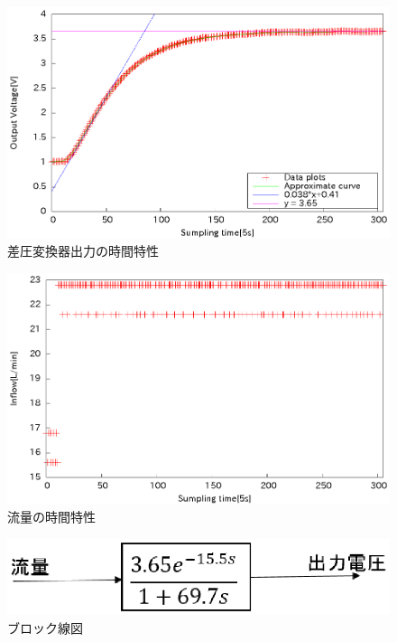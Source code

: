\documentclass[11pt,a4paper]{jsarticle}
\begin{document}
   \begin{figure}
    \begin{center}
     \includegraphics[scale=.7] {./picture/exp3_2.eps}
     \caption{差圧変換器出力の時間特性}
     \label{fig5}
    \end{center}
   \end{figure}

   \begin{figure}
    \begin{center}
     \includegraphics[scale=.7] {./picture/exp3.eps}
     \caption{流量の時間特性}
     \label{fig6}
    \end{center}
   \end{figure}

   \begin{figure}
    \begin{center}
     \includegraphics[scale=.7] {./picture/blocks_exp3.eps}
     \caption{ブロック線図}
     \label{fig7}
    \end{center}
   \end{figure}
\end{document}
